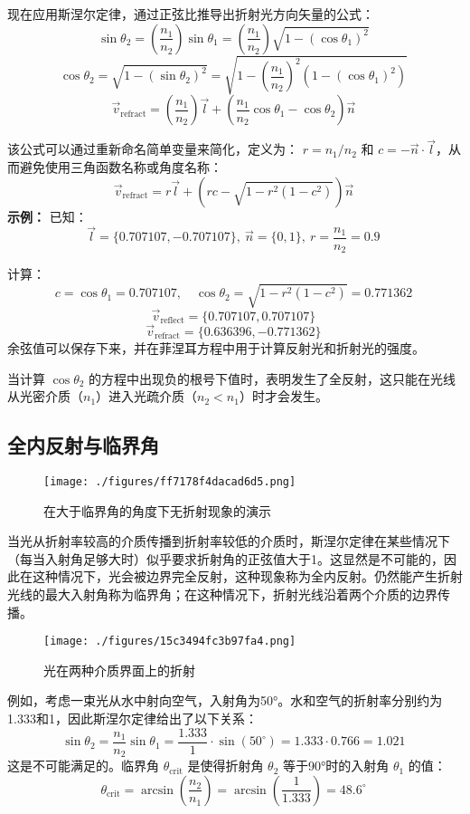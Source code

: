现在应用斯涅尔定律，通过正弦比推导出折射光方向矢量的公式：  
\[
\sin \theta_2 = \left( \frac{n_1}{n_2} \right) \sin \theta_1 = \left( \frac{n_1}{n_2} \right) \sqrt{1 - \left( \cos \theta_1 \right)^2}~
\]
\[
\cos \theta_2 = \sqrt{1 - (\sin \theta_2)^2} = \sqrt{1 - \left( \frac{n_1}{n_2} \right)^2 \left( 1 - \left( \cos \theta_1 \right)^2 \right)}~
\]
\[
\vec{v}_{\text{refract}} = \left( \frac{n_1}{n_2} \right) \vec{l} + \left( \frac{n_1}{n_2} \cos \theta_1 - \cos \theta_2 \right) \vec{n}~
\]

该公式可以通过重新命名简单变量来简化，定义为：  
\( r = n_1 / n_2 \) 和 \( c = -\vec{n} \cdot \vec{l} \)，从而避免使用三角函数名称或角度名称：  
\[
\vec{v}_{\text{refract}} = r\vec{l} + \left( rc - \sqrt{1 - r^2 (1 - c^2)} \right)\vec{n}~
\]
\textbf{示例：} 
已知：  
\[
\vec{l} = \{0.707107, -0.707107\},~\vec{n} = \{0, 1\},~r = \frac{n_1}{n_2} = 0.9~
\]

计算：  
\[
c = \cos \theta_1 = 0.707107, \quad \cos \theta_2 = \sqrt{1 - r^2 (1 - c^2)} = 0.771362~
\]
\[
\vec{v}_{\text{reflect}} = \{0.707107, 0.707107\}~
\]
\[
\vec{v}_{\text{refract}} = \{0.636396, -0.771362\}~
\]
余弦值可以保存下来，并在菲涅耳方程中用于计算反射光和折射光的强度。

当计算 \(\cos \theta_2\) 的方程中出现负的根号下值时，表明发生了全反射，这只能在光线从光密介质（\(n_1\)）进入光疏介质（\(n_2 < n_1\)）时才会发生。

\subsection{全内反射与临界角}
\begin{figure}[ht]
\centering
\texttt{[image: ./figures/ff7178f4dacad6d5.png]}
\caption{在大于临界角的角度下无折射现象的演示} \label{fig_SNR_8}
\end{figure}
当光从折射率较高的介质传播到折射率较低的介质时，斯涅尔定律在某些情况下（每当入射角足够大时）似乎要求折射角的正弦值大于1。这显然是不可能的，因此在这种情况下，光会被边界完全反射，这种现象称为全内反射。仍然能产生折射光线的最大入射角称为临界角；在这种情况下，折射光线沿着两个介质的边界传播。
\begin{figure}[ht]
\centering
\texttt{[image: ./figures/15c3494fc3b97fa4.png]}
\caption{光在两种介质界面上的折射} \label{fig_SNR_9}
\end{figure}
例如，考虑一束光从水中射向空气，入射角为50°。水和空气的折射率分别约为1.333和1，因此斯涅尔定律给出了以下关系：
\[
\sin \theta_2 = \frac{n_1}{n_2} \sin \theta_1 = \frac{1.333}{1} \cdot \sin(50^\circ) = 1.333 \cdot 0.766 = 1.021~
\]
这是不可能满足的。临界角 \(\theta_{\text{crit}}\) 是使得折射角 \(\theta_2\) 等于90°时的入射角 \(\theta_1\) 的值：
\[
\theta_{\text{crit}} = \arcsin \left( \frac{n_2}{n_1} \right) = \arcsin \left( \frac{1}{1.333} \right) = 48.6^\circ~
\]